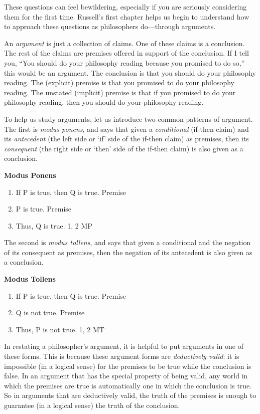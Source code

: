 \documentclass[oneside,letterpaper,12pt]{book}
\begin{document}
These questions can feel bewildering, especially if you are seriously considering them for the first time. Russell's first chapter helps us begin to understand how to approach these questions as philosophers do---through arguments.

An \emph{argument} is just a collection of claims. One of these claims is a conclusion. The rest of the claims are premises offered in support of the conclusion. If I tell you, ``You should do your philosophy reading because you promised to do so,'' this would be an argument. The conclusion is that you should do your philosophy reading. The (explicit) premise is that you promised to do your philosophy reading. The unstated (implicit) premise is that if you promised to do your philosophy reading, then you should do your philosophy reading.

To help us study arguments, let us introduce two common patterns of argument. The first is \emph{modus ponens}, and says that given a \textit{conditional} (if-then claim) and its \textit{antecedent} (the left side or `if' side of the if-then claim) as premises, then its \textit{consequent} (the right side or `then' side of the if-then claim) is also given as a conclusion.
\begin{center}
\textbf{Modus Ponens}
\end{center}
\begin{enumerate}
	\item If P is true, then Q is true. \hfill Premise
	\item P is true. \hfill Premise
	\item Thus, Q is true. \hfill 1, 2 MP
\end{enumerate}
The second is \emph{modus tollens}, and says that given a conditional and the negation of its consequent as premises, then the negation of its antecedent is also given as a conclusion.
\begin{center}
	\textbf{Modus Tollens}
\end{center}
\begin{enumerate}
	\item If P is true, then Q is true. \hfill Premise
	\item Q is not true. \hfill Premise
	\item Thus, P is not true. \hfill 1, 2 MT
\end{enumerate}
In restating a philosopher's argument, it is helpful to put arguments in one of these forms. This is because these argument forms are \textit{deductively valid}: it is impossible (in a logical sense) for the premises to be true while the conclusion is false. In an argument that has the special property of being valid, any world in which the premises are true is automatically one in which the conclusion is true. So in arguments that are deductively valid, the truth of the premises is enough to guarantee (in a logical sense) the truth of the conclusion. 
\end{document}
